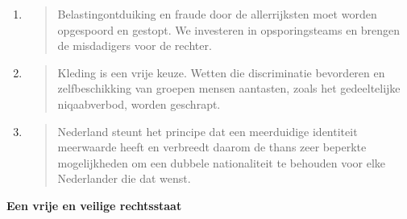 \begin{enumerate}
\item
  \begin{quote}
  Belastingontduiking en fraude door de allerrijksten moet worden
  opgespoord en gestopt. We investeren in opsporingsteams en brengen de
  misdadigers voor de rechter.
  \end{quote}
\item
  \begin{quote}
  Kleding is een vrije keuze. Wetten die discriminatie bevorderen en
  zelfbeschikking van groepen mensen aantasten, zoals het gedeeltelijke
  niqaabverbod, worden geschrapt.
  \end{quote}
\item
  \begin{quote}
  Nederland steunt het principe dat een meerduidige identiteit
  meerwaarde heeft en verbreedt daarom de thans zeer beperkte
  mogelijkheden om een dubbele nationaliteit te behouden voor elke
  Nederlander die dat wenst.
  \end{quote}
\end{enumerate}

\textbf{Een vrije en veilige rechtsstaat}

